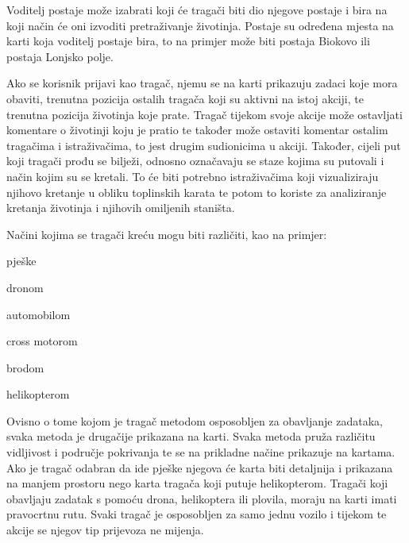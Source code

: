 	Voditelj postaje može izabrati koji će tragači biti dio njegove postaje i bira na koji način će oni izvoditi pretraživanje životinja. 
	Postaje su određena mjesta na karti koja voditelj postaje bira, to na primjer može biti postaja Biokovo ili postaja Lonjsko polje.

	Ako se korisnik prijavi kao tragač, njemu se na karti prikazuju zadaci koje mora obaviti, trenutna pozicija ostalih tragača koji su aktivni na istoj akciji, te trenutna pozicija životinja koje prate.
	Tragač tijekom svoje akcije može ostavljati komentare o životinji koju je pratio te također može ostaviti komentar ostalim tragačima i istraživačima, to jest drugim sudionicima u akciji.
	Također, cijeli put koji tragači prođu se bilježi, odnosno označavaju se staze kojima su putovali i način kojim su se kretali. To će biti potrebno istraživačima koji vizualiziraju njihovo kretanje u obliku toplinskih karata te potom to koriste za analiziranje kretanja životinja i njihovih omiljenih staništa.
	
	Načini kojima se tragači kreću mogu biti različiti, kao na primjer:
	\begin{packed_item}
		\item pješke
		\item dronom
		\item automobilom
		\item cross motorom
		\item brodom
		\item helikopterom
	\end{packed_item}

	Ovisno o tome kojom je tragač metodom osposobljen za obavljanje zadataka, svaka metoda je drugačije prikazana na karti.
	Svaka metoda pruža različitu vidljivost i područje pokrivanja te se na prikladne načine prikazuje na kartama. 
	Ako je tragač odabran da ide pješke njegova će karta biti detaljnija i prikazana na manjem prostoru nego karta tragača koji putuje helikopterom. 
	Tragači koji obavljaju zadatak s pomoću drona, helikoptera ili plovila, moraju na karti imati pravocrtnu rutu.
	Svaki tragač je osposobljen za samo jednu vozilo i tijekom te akcije se njegov tip prijevoza ne mijenja.

